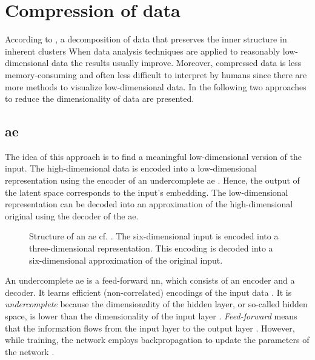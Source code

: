 \section{Compression of data}\label{sec:compression}

According to \citeauthor{clusteringDocs2020}, a decomposition of data that preserves the inner structure in inherent clusters 
When data analysis techniques are applied to reasonably low-dimensional data the results usually improve.
Moreover, compressed data is less memory-consuming and often less difficult to interpret by humans 
since there are more methods to visualize low-dimensional data.
In the following two approaches to reduce the dimensionality of data are presented.

\subsection{\acl*{ae}}\label{subsec:autoencoder}

The idea of this approach is to find a meaningful low-dimensional version of the input.
The high-dimensional data is encoded into a low-dimensional representation using the encoder of an undercomplete \ac{ae} \cite{autoencoder2020}.
Hence, the output of the latent space corresponds to the input's embedding. 
The low-dimensional representation can be decoded into an approximation of the high-dimensional original using the decoder of the \ac{ae}.

\begin{figure}[!htb] %
    \centering
    
    \caption[Structure of an \ac{ae}]
    {Structure of an \ac{ae} cf. \cite{autoencoder2020}.
    The six-dimensional input is encoded into a three-dimensional representation.
    This encoding is decoded into a six-dimensional approximation of the original input.}
    \label{fig:ae}
\end{figure}

An undercomplete \ac{ae} is a feed-forward \ac{nn}, which consists of an encoder and a decoder.
It learns efficient (non-correlated) encodings of the input data \cite{autoencoder2020}.
It is \textit{undercomplete} because the dimensionality of the hidden layer, or so-called hidden space, 
is lower than the dimensionality of the input layer \cite{seminar_ies}.
\textit{Feed-forward} means that the information flows from the input layer to the output layer \cite{seminar_ies}.
However, while training, the network employs backpropagation to update the parameters of the network \cite{seminar_ies}.

